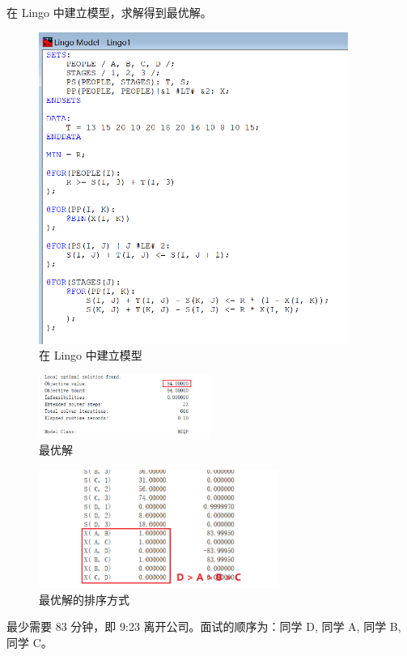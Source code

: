 \documentclass{article}
\begin{document}
在 Lingo 中建立模型，求解得到最优解。

\begin{figure}[H]
\centering
\includegraphics[width=0.9\textwidth]{img/7.png}
\caption{在 Lingo 中建立模型}
\end{figure}

\begin{figure}[H]
\centering
\includegraphics[width=0.5\textwidth]{img/8.png}
\caption{最优解}
\end{figure}

\begin{figure}[H]
\centering
\includegraphics[width=0.7\textwidth]{img/9.png}
\caption{最优解的排序方式}
\end{figure}

最少需要 83 分钟，即 9:23 离开公司。面试的顺序为：同学 D, 同学 A, 同学 B, 同学 C。
\end{document}

